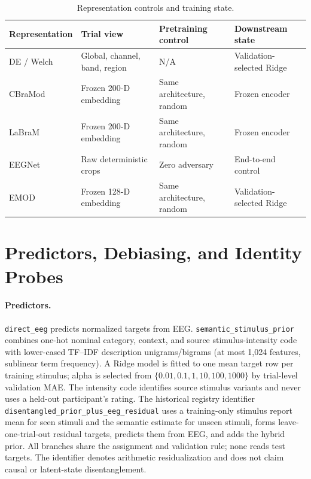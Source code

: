 \begin{table}[t]
  \caption{Representation controls and training state.}
  \label{tab:representations}
  \centering
  \small
  \begin{tabularx}{\linewidth}{@{}lXXX@{}}
    \toprule
    Representation & Trial view & Pretraining control & Downstream state \\
    \midrule
    DE / Welch & Global, channel, band, region & N/A & Validation-selected Ridge \\
    CBraMod & Frozen 200-D embedding & Same architecture, random & Frozen encoder \\
    LaBraM & Frozen 200-D embedding & Same architecture, random & Frozen encoder \\
    EEGNet & Raw deterministic crops & Zero adversary & End-to-end control \\
    EMOD & Frozen 128-D embedding & Same architecture, random & Validation-selected Ridge \\
    \bottomrule
  \end{tabularx}
\end{table}

\section{Predictors, Debiasing, and Identity Probes}

\paragraph{Predictors.}
\texttt{direct\_eeg} predicts normalized targets from EEG.
\texttt{semantic\_stimulus\_prior} combines one-hot nominal category, context,
and source stimulus-intensity code with lower-cased TF--IDF description
unigrams/bigrams (at most 1,024 features, sublinear term frequency). A Ridge
model is fitted to one mean target row per training stimulus; alpha is selected
from $\{0.01,0.1,1,10,100,1000\}$ by trial-level validation MAE. The intensity
code identifies source stimulus variants and never uses a held-out participant's
rating. The historical registry identifier
\texttt{disentangled\_prior\_plus\_eeg\_residual} uses a training-only
stimulus report mean for seen stimuli and the semantic estimate for unseen
stimuli, forms leave-one-trial-out residual targets, predicts them from EEG, and
adds the hybrid prior. All branches share the assignment and validation rule;
none reads test targets. The identifier denotes arithmetic residualization and
does not claim causal or latent-state disentanglement.


